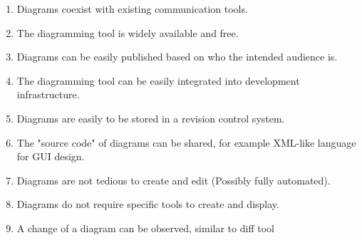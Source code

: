 \documentclass{sig-alternate}
\begin{document}
\begin{enumerate} [nolistsep]
\item Diagrams coexist with existing communication tools. 
\item The diagramming tool is widely available and free. 
\item Diagrams can be easily published based on who the intended audience is. 
\item The diagramming tool can be easily integrated into development infrastructure.
\item Diagrams are easily to be stored in a revision control system. 
\item The "source code" of diagrams can be shared, for example XML-like language for GUI design. 
\item Diagrams are  not tedious to create and edit (Possibly fully automated).
\item Diagrams do not require specific tools to create and display. 
\item A change of a diagram can be observed, similar to diff tool

\end{enumerate}
\end{document}
